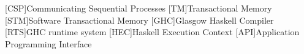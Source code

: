 \begin{acronym}[ACRONYM]
[CSP]{Communicating Sequential Processes}
[TM]{Transactional Memory}
[STM]{Software Transactional Memory}
[GHC]{Glasgow Haskell Compiler}
[RTS]{GHC runtime system}
[HEC]{Haskell Execution Context}
[API]{Application Programming Interface}
\end{acronym}
